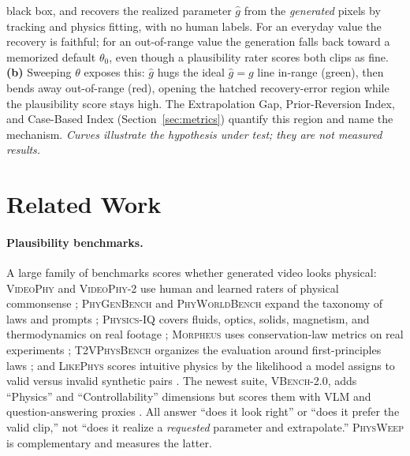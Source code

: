 \begin{center}
{black box, and recovers the realized parameter $\hat g$ from the \emph{generated}
pixels by tracking and physics fitting, with no human labels. For an everyday
value the recovery is faithful; for an out-of-range value the generation falls
back toward a memorized default $\theta_0$, even though a plausibility rater
scores both clips as fine. \textbf{(b)} Sweeping $\theta$ exposes this: $\hat g$
hugs the ideal $\hat g{=}g$ line in-range (green), then bends away out-of-range
(red), opening the hatched recovery-error region while the plausibility score
stays high. The Extrapolation Gap, Prior-Reversion Index, and Case-Based Index
(Section~\ref{sec:metrics}) quantify this region and name the mechanism.
\emph{Curves illustrate the hypothesis under test; they are not measured results.}}
\end{center}

\section{Related Work}
\label{sec:related}

\paragraph{Plausibility benchmarks.}
A large family of benchmarks scores whether generated video looks physical:
\textsc{VideoPhy} and \textsc{VideoPhy-2} use human and learned raters of
physical commonsense \citep{bansal2024videophy,bansal2025videophy2};
\textsc{PhyGenBench} and \textsc{PhyWorldBench} expand the taxonomy of laws and
prompts \citep{meng2024phygenbench,phyworldbench2025}; \textsc{Physics-IQ}
covers fluids, optics, solids, magnetism, and thermodynamics on real footage
\citep{motamed2025physicsiq}; \textsc{Morpheus} uses conservation-law metrics on
real experiments \citep{zhang2025morpheus}; \textsc{T2VPhysBench} organizes the
evaluation around first-principles laws \citep{t2vphysbench2025}; and
\textsc{LikePhys} scores intuitive physics by the likelihood a model assigns to
valid versus invalid synthetic pairs \citep{likephys2025}. The newest suite,
\textsc{VBench-2.0}, adds ``Physics'' and ``Controllability'' dimensions but
scores them with VLM and question-answering proxies \citep{vbench2_2025}. All
answer ``does it look right'' or ``does it prefer the valid clip,'' not ``does it
realize a \emph{requested} parameter and extrapolate.''
\textsc{PhysWeep} is complementary and measures the latter.

